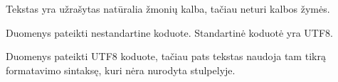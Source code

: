 \documentclass[letterpaper,10pt,lithuanian]{sphinxmanual}
\begin{document}
\begin{fulllineitems}
\begin{sphinxtopic}
\begin{description}
\sphinxAtStartPar
Tekstas yra užrašytas natūralia žmonių kalba, tačiau neturi kalbos
žymės.

\sphinxAtStartPar
Duomenys pateikti nestandartine koduote. Standartinė koduotė yra
UTF\sphinxhyphen{}8.

\sphinxAtStartPar
Duomenys pateikti UTF\sphinxhyphen{}8 koduote, tačiau pats tekstas naudoja tam
tikrą formatavimo sintaksę, kuri nėra nurodyta {\hyperref[\detokenize{dimensijos:property.ref}]{}}
stulpelyje.

\end{description}
\end{sphinxtopic}

\end{fulllineitems}

\end{document}
